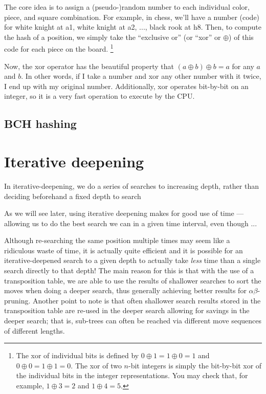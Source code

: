 \documentclass[10pt,dvipdfmx,letterpaper]{report}
\newcommand{\ab}{{$\alpha\beta$}}
\begin{document}
The core idea is to assign a (pseudo-)random number to each individual color, piece, and square
combination.  For example, in chess, we'll have a number (code) for white knight at a1, white knight at a2,
..., black rook at h8.  Then, to compute the hash of a position, we simply take the ``exclusive or''
(or ``xor'' or $\oplus$) of this code for each piece on the board.
\footnote{
  The xor of individual bits is defined by $0\oplus1=1\oplus0=1$ and $0\oplus0=1\oplus1=0$.
  The xor of two $n$-bit integers is simply the bit-by-bit xor of the individual bits in the
  integer representations.  You may check that, for example, $1\oplus3=2$ and $1\oplus4=5$.
}

Now, the xor operator has the beautiful property that $(a\oplus b)\oplus b = a$ for any $a$ and $b$.
In other words, if I take a number and xor any other number with it twice, I end up with my original number.
Additionally, xor operates bit-by-bit on an integer, so it is a very fast operation to execute by the CPU.

\subsection{BCH hashing}

\section{Iterative deepening}

In iterative-deepening, we do a series of searches to increasing depth, rather than
deciding beforehand a fixed depth to search

As we will see later, using iterative deepening makes for good use of
time --- allowing us to do the best search we can in a given time interval,
even though ...

Although re-searching the same position multiple times may seem like a ridiculous waste
of time, it is actually quite efficient and it is possible for an iterative-deepened search to
a given depth to actually take {\em less} time than a single search directly to that depth!
The main reason for this is that with the use of a transposition table, we are able to use
the results of shallower searches to sort the moves when doing a deeper search, thus generally
achieving better results for \ab-pruning.  Another point to note is that often shallower search results
stored in the transposition table are re-used in the deeper search allowing for savings in the
deeper search; that is, sub-trees can often be reached via different move sequences of different lengths.
\end{document}
